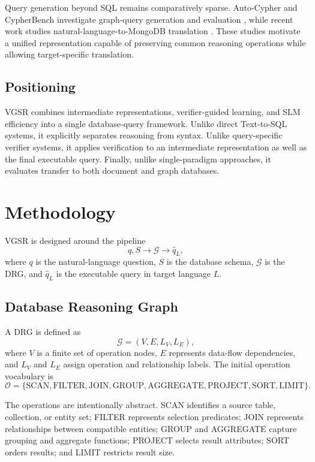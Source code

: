 \documentclass[conference]{IEEEtran}
\begin{document}
Query generation beyond SQL remains comparatively sparse. Auto-Cypher and CypherBench investigate graph-query generation and evaluation \cite{c39,c40}, while recent work studies natural-language-to-MongoDB translation \cite{c41}. These studies motivate a unified representation capable of preserving common reasoning operations while allowing target-specific translation.

\subsection{Positioning}
VGSR combines intermediate representations, verifier-guided learning, and SLM efficiency into a single database-query framework. Unlike direct Text-to-SQL systems, it explicitly separates reasoning from syntax. Unlike query-specific verifier systems, it applies verification to an intermediate representation as well as the final executable query. Finally, unlike single-paradigm approaches, it evaluates transfer to both document and graph databases.

\section{Methodology}
\label{sec:method}
VGSR is designed around the pipeline
\begin{equation}
q,S \rightarrow \mathcal{G} \rightarrow \hat{q}_{L},
\end{equation}
where $q$ is the natural-language question, $S$ is the database schema, $\mathcal{G}$ is the DRG, and $\hat{q}_{L}$ is the executable query in target language $L$.

\subsection{Database Reasoning Graph}
A DRG is defined as
\begin{equation}
\mathcal{G}=(V,E,L_V,L_E),
\end{equation}
where $V$ is a finite set of operation nodes, $E$ represents data-flow dependencies, and $L_V$ and $L_E$ assign operation and relationship labels. The initial operation vocabulary is
\begin{equation}
\mathcal{O}=\{\mathrm{SCAN},\mathrm{FILTER},\mathrm{JOIN},
\mathrm{GROUP},\mathrm{AGGREGATE},\mathrm{PROJECT},\mathrm{SORT},\mathrm{LIMIT}\}.
\end{equation}

The operations are intentionally abstract. SCAN identifies a source table, collection, or entity set; FILTER represents selection predicates; JOIN represents relationships between compatible entities; GROUP and AGGREGATE capture grouping and aggregate functions; PROJECT selects result attributes; SORT orders results; and LIMIT restricts result size.
\end{document}

